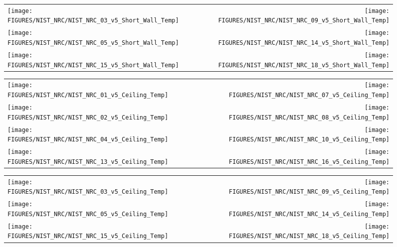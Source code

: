 \begin{figure}[h!]
\begin{tabular*}{\textwidth}{l@{\extracolsep{\fill}}r}
\texttt{[image: FIGURES/NIST\_NRC/NIST\_NRC\_03\_v5\_Short\_Wall\_Temp]} &
\texttt{[image: FIGURES/NIST\_NRC/NIST\_NRC\_09\_v5\_Short\_Wall\_Temp]} \\
\texttt{[image: FIGURES/NIST\_NRC/NIST\_NRC\_05\_v5\_Short\_Wall\_Temp]} &
\texttt{[image: FIGURES/NIST\_NRC/NIST\_NRC\_14\_v5\_Short\_Wall\_Temp]} \\
\texttt{[image: FIGURES/NIST\_NRC/NIST\_NRC\_15\_v5\_Short\_Wall\_Temp]} &
\texttt{[image: FIGURES/NIST\_NRC/NIST\_NRC\_18\_v5\_Short\_Wall\_Temp]}
\end{tabular*}
\label{NIST_NRC_Short_Wall_Temp_Open}
\end{figure}

\clearpage



\begin{figure}[h!]
\begin{tabular*}{\textwidth}{l@{\extracolsep{\fill}}r}
\texttt{[image: FIGURES/NIST\_NRC/NIST\_NRC\_01\_v5\_Ceiling\_Temp]} &
\texttt{[image: FIGURES/NIST\_NRC/NIST\_NRC\_07\_v5\_Ceiling\_Temp]} \\
\texttt{[image: FIGURES/NIST\_NRC/NIST\_NRC\_02\_v5\_Ceiling\_Temp]} &
\texttt{[image: FIGURES/NIST\_NRC/NIST\_NRC\_08\_v5\_Ceiling\_Temp]} \\
\texttt{[image: FIGURES/NIST\_NRC/NIST\_NRC\_04\_v5\_Ceiling\_Temp]} &
\texttt{[image: FIGURES/NIST\_NRC/NIST\_NRC\_10\_v5\_Ceiling\_Temp]} \\
\texttt{[image: FIGURES/NIST\_NRC/NIST\_NRC\_13\_v5\_Ceiling\_Temp]} &
\texttt{[image: FIGURES/NIST\_NRC/NIST\_NRC\_16\_v5\_Ceiling\_Temp]}
\end{tabular*}
\label{NIST_NRC_Ceiling_Temp_Closed}
\end{figure}

\begin{figure}[h!]
\begin{tabular*}{\textwidth}{l@{\extracolsep{\fill}}r}
\texttt{[image: FIGURES/NIST\_NRC/NIST\_NRC\_03\_v5\_Ceiling\_Temp]} &
\texttt{[image: FIGURES/NIST\_NRC/NIST\_NRC\_09\_v5\_Ceiling\_Temp]} \\
\texttt{[image: FIGURES/NIST\_NRC/NIST\_NRC\_05\_v5\_Ceiling\_Temp]} &
\texttt{[image: FIGURES/NIST\_NRC/NIST\_NRC\_14\_v5\_Ceiling\_Temp]} \\
\texttt{[image: FIGURES/NIST\_NRC/NIST\_NRC\_15\_v5\_Ceiling\_Temp]} &
\texttt{[image: FIGURES/NIST\_NRC/NIST\_NRC\_18\_v5\_Ceiling\_Temp]}
\end{tabular*}
\label{NIST_NRC_Ceiling_Temp_Open}
\end{figure}

